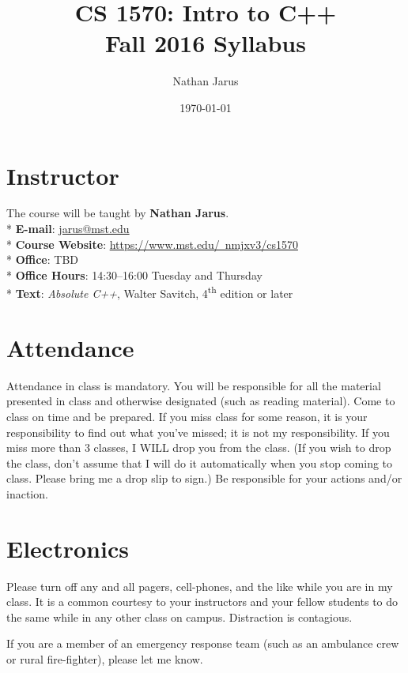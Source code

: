 \documentclass{article}
\title{CS 1570: Intro to C++ \\ Fall 2016 Syllabus}
\date{\today}
\author{Nathan Jarus}
\begin{document}
\maketitle

\section{Instructor}
The course will be taught by \textbf{Nathan Jarus}. \\*
\textbf{E-mail}: \href{mailto:jarus@mst.edu}{jarus@mst.edu} \\*
\textbf{Course Website}: \href{https://www.mst.edu/~nmjxv3/cs1570}{https://www.mst.edu/~nmjxv3/cs1570} \\*
\textbf{Office}: TBD \\*
\textbf{Office Hours}: 14:30--16:00 Tuesday and Thursday\\*
\textbf{Text}: \textit{Absolute C++}, Walter Savitch, 4\textsuperscript{th} edition or later\\

\section{Attendance}
Attendance in class is mandatory.
You will be responsible for all the material presented in class and otherwise designated (such as reading material).
Come to class on time and be prepared.
If you miss class for some reason, it is your responsibility to find out what you've missed; it is not my responsibility.
If you miss more than 3 classes, I WILL drop you from the class.
(If you wish to drop the class, don't assume that I will do it automatically when you stop coming to class. Please bring me a drop slip to sign.)
Be responsible for your actions and/or inaction.

\section{Electronics}
Please turn off any and all pagers, cell-phones, and the like while you are in my class.
It is a common courtesy to your instructors and your fellow students to do the same while in any other class on campus.
Distraction is contagious.

If you are a member of an emergency response team (such as an ambulance crew or rural fire-fighter), please let me know.
\end{document}
